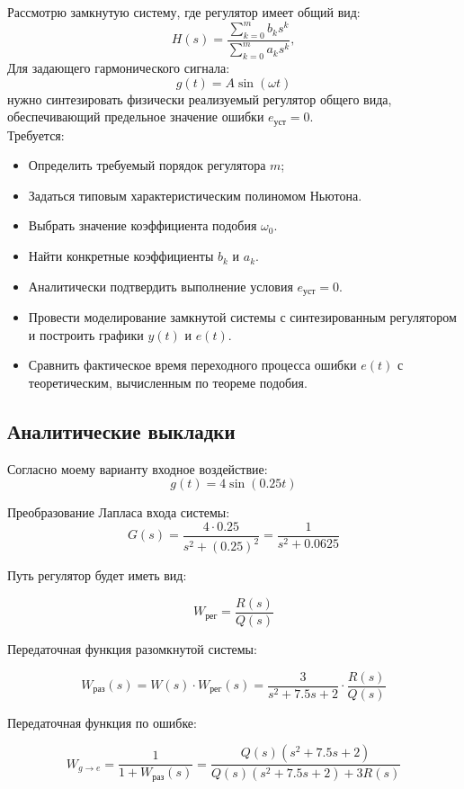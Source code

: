 \documentclass[a4paper,12pt]{article}
\begin{document}
	
	Рассмотрю замкнутую систему, где регулятор имеет общий вид:
	\[
	H(s) = 
	\dfrac{\displaystyle\sum_{k=0}^{m} b_k s^k}
	{\displaystyle\sum_{k=0}^{m} a_k s^k},
	\]
	Для задающего гармонического сигнала:
	\[
	g(t) = A \sin(\omega t)
	\]
	нужно синтезировать физически реализуемый регулятор общего вида, обеспечивающий предельное значение ошибки \( e_{\text{уст}} = 0 \).\\
	
	Требуется:
	
	\begin{itemize}
		\item Определить требуемый порядок регулятора \( m \);
		\item Задаться типовым характеристическим полиномом Ньютона.
		\item Выбрать значение коэффициента подобия \( \omega_0 \).
		\item Найти конкретные коэффициенты \( b_k \) и \( a_k \).
		\item Аналитически подтвердить выполнение условия \( e_{\text{уст}} = 0 \).
		\item Провести моделирование замкнутой системы с синтезированным регулятором и построить графики \( y(t) \) и \( e(t) \).
		\item Сравнить фактическое время переходного процесса ошибки \( e(t) \) с теоретическим, вычисленным по теореме подобия.
	\end{itemize}
	
	
	\subsection{Аналитические выкладки}
	
	Согласно моему варианту входное воздействие: \[g(t) = 4\sin(0.25t)\]
	
	Преобразование Лапласа входа системы:
	\[ G(s) = \frac{4 \cdot 0.25}{s^2 + (0.25)^2} = \frac{1}{s^2 + 0.0625} \]
	
	Путь регулятор будет иметь вид:
	
	\[W_\text{рег} = \dfrac{R(s)}{Q(s)}\]
	
	Передаточная функция разомкнутой системы:
	
	\[W_{\text{раз}}(s) = W(s) \cdot W_{\text{рег}}(s) = \frac{3}{s^2 + 7.5s + 2} \cdot \frac{R(s)}{Q(s)}\]
	
	Передаточная функция по ошибке:
	
	\[W_{g \to e} = \frac{1}{1 + W_{\text{раз}}(s)} = \frac{Q(s)(s^2 + 7.5s + 2)}{Q(s)(s^2 + 7.5s + 2) + 3R(s)}\]
	
\end{document}
